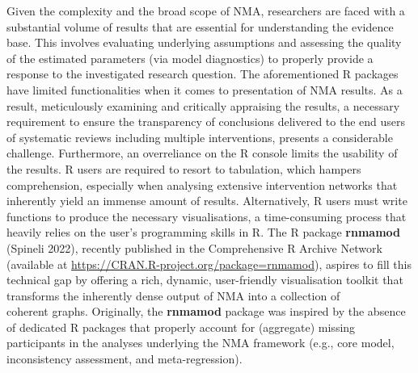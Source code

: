 Given the complexity and the broad scope of NMA, researchers are faced with
a substantial volume of results that are essential for understanding the evidence base. This involves
evaluating underlying assumptions and assessing the quality of the estimated parameters (via model
diagnostics) to properly provide a response to the investigated research question.
The aforementioned R packages have limited functionalities when it comes to presentation of NMA results.
As a result, meticulously examining and critically appraising the results, a necessary requirement to ensure the transparency
of conclusions delivered to the end users of systematic reviews including multiple interventions, presents a considerable challenge.
Furthermore, an overreliance on the R console limits the usability of the results. R users are required
to resort to tabulation, which hampers comprehension, especially when analysing extensive intervention networks that inherently yield an immense amount
of results. Alternatively, R users must write functions to produce the
necessary visualisations, a time-consuming process that heavily relies on the user's programming skills in R.
The R package \textbf{rnmamod} (Spineli 2022), recently published in the Comprehensive R Archive
Network (available at
\url{https://CRAN.R-project.org/package=rnmamod}),
aspires to fill this technical gap by offering a rich, dynamic, user-friendly
visualisation toolkit that transforms the inherently dense output of NMA into a collection of\\
coherent graphs. Originally, the \textbf{rnmamod} package was inspired by the absence of dedicated
R packages that properly account for (aggregate) missing participants in the analyses
underlying the NMA framework (e.g., core model, inconsistency assessment, and
meta-regression).

